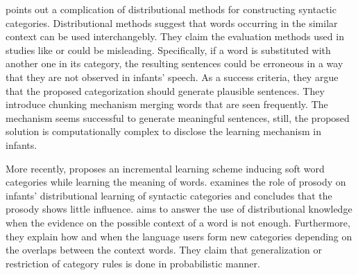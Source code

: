 \cite{freudenthal2005resolution} points out a complication of distributional
methods for constructing syntactic categories. Distributional methods suggest 
that words occurring in the similar context  can be used interchangebly. They 
claim the evaluation methods used in studies like \cite{Redington98distributionalinformation, monaghan2008integration} or \cite{Mintz200391} could be misleading. Specifically, if a word is substituted with another one in its
category, the resulting sentences could be erroneous in a way that they are not observed in
infants' speech. As a success criteria, they argue that the proposed categorization
should generate plausible sentences. They introduce chunking mechanism merging 
words that are seen frequently. The mechanism seems
successful to generate meaningful sentences, still, the
proposed solution is computationally complex to disclose the learning mechanism
in infants.

More recently, \cite{alishahi2012concurrent} proposes an incremental learning
scheme inducing soft word categories while learning the meaning of words. 
\cite{thothathiri2012effect}
examines the role of prosody on infants' distributional learning of
syntactic categories and concludes that the prosody shows little
influence. \cite{reeder2013shared} aims to answer the use of distributional knowledge
when the evidence on  the possible context of a word is not enough. Furthermore,
they explain how and when the language users form new categories depending on 
the overlaps between the context words. They claim that generalization
or restriction of category rules is done in probabilistic manner.
